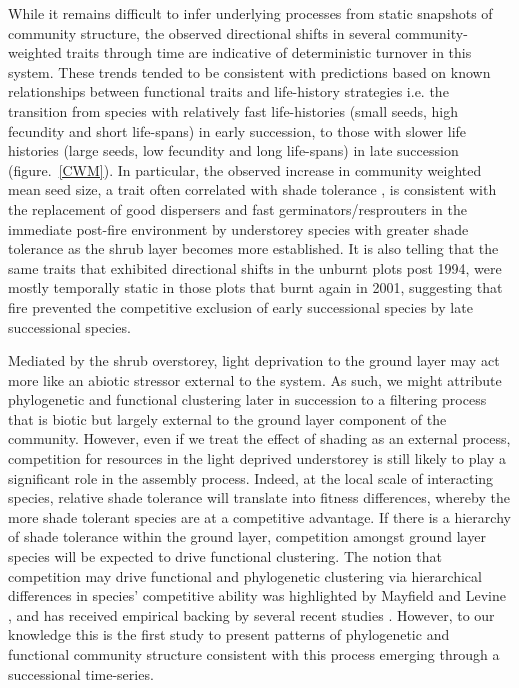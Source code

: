 While it remains difficult to infer underlying processes from static snapshots of community structure, the observed directional shifts in several community-weighted traits through time are indicative of deterministic turnover in this system. These trends tended to be consistent with predictions based on known relationships between functional traits and life-history strategies \citep{Westoby2002, Adler2013a} i.e. the transition from species with relatively fast life-histories (small seeds, high fecundity and short life-spans) in early succession, to those with slower life histories (large seeds, low fecundity and long life-spans) in late succession (figure.~\ref{CWM}). In particular, the observed increase in community weighted mean seed size, a trait often correlated with shade tolerance \citep{Coomes2003}, is consistent with the replacement of good dispersers and fast germinators/resprouters in the immediate post-fire environment by understorey species with greater shade tolerance as the shrub layer becomes more established. It is also telling that the same traits that exhibited directional shifts in the unburnt plots post 1994, were mostly temporally static in those plots that burnt again in 2001, suggesting that fire prevented the competitive exclusion of early successional species by late successional species. 
 
Mediated by the shrub overstorey, light deprivation to the ground layer may act more like an abiotic stressor external to the system. As such, we might attribute phylogenetic and functional clustering later in succession to a filtering process that is biotic but largely external to the ground layer component of the community. However, even if we treat the effect of shading as an external process, competition for resources in the light deprived understorey is still likely to play a significant role in the assembly process. Indeed, at the local scale of interacting species, relative shade tolerance will translate into fitness differences, whereby the more shade tolerant species are at a competitive advantage. If there is a hierarchy of shade tolerance within the ground layer, competition amongst ground layer species will be expected to drive functional clustering. The notion that competition may drive functional and phylogenetic clustering via hierarchical differences in species' competitive ability was  highlighted by Mayfield and Levine \citep{Mayfield2010}, and has received empirical backing by several recent studies \citep{Kunstler2012, Bennett2013, Narwani2013}. However, to our knowledge this is the first study to present patterns of phylogenetic and functional community structure consistent with this process emerging through a successional time-series.

